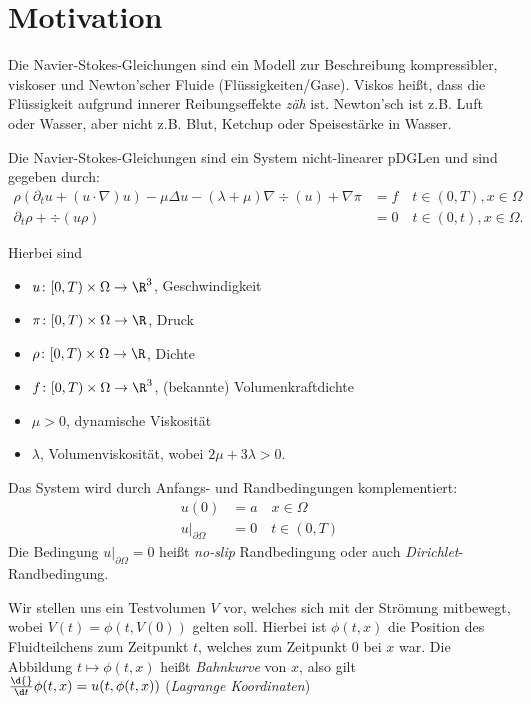 \setcounter{chapter}{-1}
\chapter{Motivation}

Die Navier-Stokes-Gleichungen sind ein Modell zur Beschreibung kompressibler, viskoser und Newton'scher Fluide (Flüssigkeiten/Gase).
Viskos heißt, dass die Flüssigkeit aufgrund innerer Reibungseffekte \emph{zäh} ist.
Newton'sch ist z.B. Luft oder Wasser, aber nicht z.B. Blut, Ketchup oder Speisestärke in Wasser.

Die Navier-Stokes-Gleichungen sind ein System nicht-linearer pDGLen und sind gegeben durch:
\begin{align*}
  \rho(\partial_t u + (u \cdot \nabla)u) - \mu \Delta u - (\lambda + \mu) \nabla \div(u) + \nabla \pi &= f \quad t \in (0,T), x \in \Omega \\
  \partial_t \rho + \div(u\rho) &= 0 \quad t \in (0,t), x \in \Omega.
\end{align*}

Hierbei sind
\begin{itemize}
  \item $u \colon [0,T) \times \Omega \to \R^3$, Geschwindigkeit
  \item $\pi \colon [0,T) \times \Omega \to \R$, Druck
  \item $\rho \colon [0,T) \times \Omega \to \R$, Dichte
  \item $f \colon [0,T) \times \Omega \to \R^3$, (bekannte) Volumenkraftdichte
  \item $\mu > 0$, dynamische Viskosität
  \item $\lambda$, Volumenviskosität, wobei $2\mu + 3\lambda > 0$.
\end{itemize}

Das System wird durch Anfangs- und Randbedingungen komplementiert:
\begin{align*}
  u(0) &= a \quad x \in \Omega \\
  u|_{\partial\Omega} &= 0 \quad t \in (0,T)
\end{align*}
Die Bedingung $u|_{\partial\Omega} = 0$ heißt \emph{no-slip} Randbedingung oder auch \emph{Dirichlet}-Randbedingung.

Wir stellen uns ein Testvolumen $V$ vor, welches sich mit der Strömung mitbewegt, wobei $V(t) = \phi(t, V(0))$ gelten soll. Hierbei ist $\phi(t,x)$ die Position des Fluidteilchens zum Zeitpunkt $t$, welches zum Zeitpunkt $0$ bei $x$ war.
Die Abbildung $t \mapsto \phi(t,x)$ heißt \emph{Bahnkurve} von $x$, also gilt $\frac{\d{}}{\d t} \phi(t,x) = u(t, \phi(t,x))$ (\emph{Lagrange Koordinaten})

